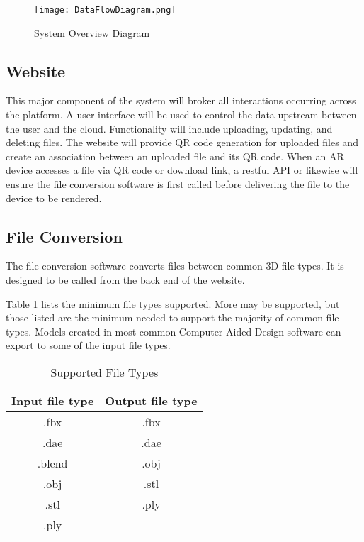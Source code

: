 \begin{figure}[H]
	\centering
	\texttt{[image: DataFlowDiagram.png]}
	\caption{System Overview Diagram} 
	\label{fig:UMLSystemOverview}	
\end{figure}

\subsection{Website}
This major component of the system will broker all interactions occurring across the platform. A user interface will be used to control the data upstream between the user and the cloud. Functionality will include uploading, updating, and deleting files. The website will provide QR code generation for uploaded files and create an association between an uploaded file and its QR code. When an AR device accesses a file via QR code or download link, a restful API or likewise will ensure the file conversion software is first called before delivering the file to the device to be rendered.  


\subsection{File Conversion}
The file conversion software converts files between common 3D file types. It is designed to be called from the back end of the website.

Table \ref{tab:suportedfiletypes} lists the minimum file types supported.  More may be supported, but those listed are the minimum needed to support the majority of common file types.  
Models created in most common Computer Aided Design software can export to some of the input file types.

\begin{table}[!h]
    \centering
    \begin{tabular}{| c | c |}
        \hline
        Input file type & Output file type \\
        \hline
        .fbx & .fbx \\
        .dae & .dae \\
        .blend & .obj \\ 
        .obj & .stl \\
        .stl & .ply \\
        .ply & \\
        \hline
    \end{tabular}
    \caption{Supported File Types}
    \label{tab:suportedfiletypes}
\end{table}

